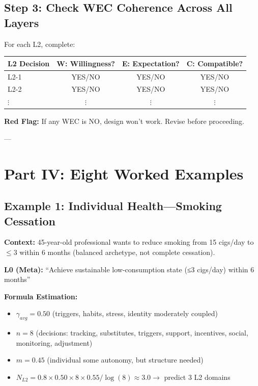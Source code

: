 \documentclass[11pt, a4paper]{article}
\begin{document}
\subsection{Step 3: Check WEC Coherence Across All Layers} \label{sec:ch15-part3c}

For each L2, complete:

\begin{center}
\begin{tabular}{|l|c|c|c|}
\hline
\textbf{L2 Decision} & \textbf{W: Willingness?} & \textbf{E: Expectation?} & \textbf{C: Compatible?} \\
\hline
L2-1 & YES/NO & YES/NO & YES/NO \\
\hline
L2-2 & YES/NO & YES/NO & YES/NO \\
\hline
$\vdots$ & $\vdots$ & $\vdots$ & $\vdots$ \\
\hline
\end{tabular}
\end{center}

\textbf{Red Flag:} If any WEC is NO, design won't work. Revise before proceeding.

---

\section{Part IV: Eight Worked Examples} \label{sec:ch15-part4a}

\subsection{Example 1: Individual Health---Smoking Cessation} \label{sec:ch15-part4b}

\textbf{Context:} 45-year-old professional wants to reduce smoking from 15 cigs/day to $\leq 3$ within 6 months (balanced archetype, not complete cessation).

\textbf{L0 (Meta):} ``Achieve sustainable low-consumption state (≤3 cigs/day) within 6 months''

\textbf{Formula Estimation:}
\begin{itemize}[nosep]
    \item $\gamma_{avg} = 0.50$ (triggers, habits, stress, identity moderately coupled)
    \item $n = 8$ (decisions: tracking, substitutes, triggers, support, incentives, social, monitoring, adjustment)
    \item $m = 0.45$ (individual some autonomy, but structure needed)
    \item $N_{L2} = 0.8 \times 0.50 \times 8 \times 0.55 / \log(8) \approx 3.0 \rightarrow$ predict 3 L2 domains
\end{itemize}
\end{document}
